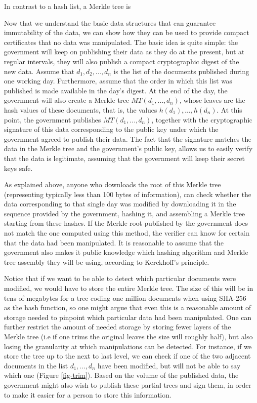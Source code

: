 In contrast to a hash list, a Merkle tree is 

\medskip
{} Now that we understand the basic data structures that can guarantee immutability of the data, we can show how they can be used to provide compact certificates that no data was manipulated. The basic idea is quite simple: the government will keep on publishing their data as they do at the present, but at regular intervals, they will also publish a compact cryptographic digest of the new data. Assume that $d_1,d_2,\ldots ,d_n$ is the list of the documents published during one working day. Furthermore, assume that the order in which this list was published is made available in the day's digest. At the end of the day, the government will also create a Merkle tree $MT(d_1,\ldots ,d_n)$, whose leaves are the hash values of these documents, that is, the values $h(d_1),\ldots ,h(d_n)$. At this point, the government publishes $MT(d_1,\ldots ,d_n)$, together with the cryptographic signature of this data corresponding to the public key under which the government agreed to publish their data. The fact that the signature matches the data in the Merkle tree and the government's public key, allows us to easily verify that the data is legitimate, assuming that the government will keep their secret keys safe.

As explained above, anyone who downloads the root of this Merkle tree (representing typically less than 100 bytes of information), can check whether the data corresponding to that single day was modified by downloading it in the sequence provided by the government, hashing it, and assembling a Merkle tree starting from these hashes. If the Merkle root published by the government does not match the one computed using this method, the verifier can know for certain that the data had been manipulated. It is reasonable to assume that the government also makes it public knowledge which hashing algorithm and Merkle tree assembly they will be using, according to Kerckhoff's principle.

Notice that if we want to be able to detect which particular documents were modified, we would have to store the entire Merkle tree. The size of this will be in tens of megabytes for a tree coding one million documents when using SHA-256 as the hash function, so one might argue that even this is a reasonable amount of storage needed to pinpoint which particular data had been manipulated. One can further restrict the amount of needed storage by storing fewer layers of the Merkle tree (i.e if one trims the original leaves the size will roughly half), but also losing the granularity at which manipulations can be detected. For instance, if we store the tree up to the next to last level, we can check if one of the two adjacent documents in the list $d_1,\ldots ,d_n$ have been modified, but will not be able to say which one (Figure \ref{fig-trim}). Based on the volume of the published data, the government might also wish to publish these partial trees and sign them, in order to make it easier for a person to store this information.

